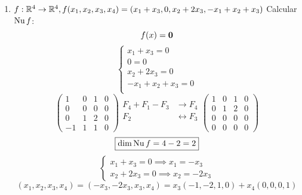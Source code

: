 \documentclass[../practica.root.tex]{subfiles}
\begin{document}
\begin{enumerate}
\begin{enumerate}
              \item \( f : \mathbb{R}^4 \to \mathbb{R}^4, f(x_1,x_2,x_3,x_4) = (x_1 + x_3, 0, x_2 + 2x_3, -x_1 + x_2 + x_3) \)
                    Calcular \(\operatorname{Nu} f\):
                    \[ f(x) = \mathbf{0} \]
                    \[
                        \begin{cases}
                            x_1 + x_3 = 0        \\
                            0 = 0                \\
                            x_2 + 2x_3 = 0       \\
                            -x_1 + x_2 + x_3 = 0 \\
                        \end{cases}
                    \] \[
                        \begin{pmatrix}
                            1  & 0 & 1 & 0 \\
                            0  & 0 & 0 & 0 \\
                            0  & 1 & 2 & 0 \\
                            -1 & 1 & 1 & 0
                        \end{pmatrix}
                        \begin{array}{rl}
                            F_4 + F_1 - F_3 & \to F_4             \\
                            F_2             & \leftrightarrow F_3 \\
                        \end{array}
                        \begin{pmatrix}
                            1 & 0 & 1 & 0 \\
                            0 & 1 & 2 & 0 \\
                            0 & 0 & 0 & 0 \\
                            0 & 0 & 0 & 0
                        \end{pmatrix}
                    \] \[
                        \boxed{\dim \operatorname{Nu} f = 4 - 2 = 2}
                    \] \[
                        \begin{cases}
                            x_1 + x_3 = 0 \implies x_1 = -x_3 \\
                            x_2 + 2x_3 = 0 \implies x_2 = -2x_3
                        \end{cases}
                    \] \[
                        (x_1, x_2, x_3, x_4) = (-x_3, -2x_3, x_3, x_4) = x_3(-1,-2,1,0) + x_4(0,0,0,1)
\]
\end{enumerate}
\end{enumerate}
\end{document}
